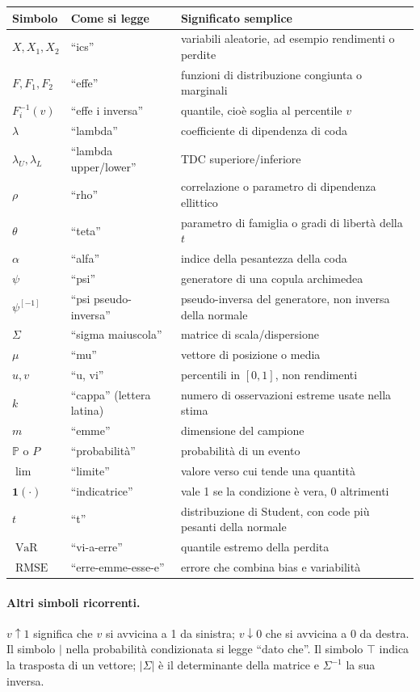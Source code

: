 \documentclass[11pt,a4paper]{article}
\newcommand{\Prob}{\mathbb{P}}
\newcommand{\ind}{\mathbf{1}}
\begin{document}
\begin{center}
\small
\begin{tabular}{p{}p{}p{}}
\toprule
Simbolo & Come si legge & Significato semplice\\
\midrule
$X,X_1,X_2$ & ``ics'' & variabili aleatorie, ad esempio rendimenti o perdite\\
$F,F_1,F_2$ & ``effe'' & funzioni di distribuzione congiunta o marginali\\
$F_i^{-1}(v)$ & ``effe i inversa'' & quantile, cioè soglia al percentile $v$\\
$\lambda$ & ``lambda'' & coefficiente di dipendenza di coda\\
$\lambda_U,\lambda_L$ & ``lambda upper/lower'' & TDC superiore/inferiore\\
$\rho$ & ``rho'' & correlazione o parametro di dipendenza ellittico\\
$\theta$ & ``teta'' & parametro di famiglia o gradi di libertà della $t$\\
$\alpha$ & ``alfa'' & indice della pesantezza della coda\\
$\psi$ & ``psi'' & generatore di una copula archimedea\\
$\psi^{[-1]}$ & ``psi pseudo-inversa'' & pseudo-inversa del generatore, non inversa della normale\\
$\Sigma$ & ``sigma maiuscola'' & matrice di scala/dispersione\\
$\mu$ & ``mu'' & vettore di posizione o media\\
$u,v$ & ``u, vi'' & percentili in $[0,1]$, non rendimenti\\
$k$ & ``cappa'' (lettera latina) & numero di osservazioni estreme usate nella stima\\
$m$ & ``emme'' & dimensione del campione\\
$\Prob$ o $P$ & ``probabilità'' & probabilità di un evento\\
$\lim$ & ``limite'' & valore verso cui tende una quantità\\
$\ind(\cdot)$ & ``indicatrice'' & vale 1 se la condizione è vera, 0 altrimenti\\
$t$ & ``t'' & distribuzione di Student, con code più pesanti della normale\\
$\operatorname{VaR}$ & ``vi-a-erre'' & quantile estremo della perdita\\
$\operatorname{RMSE}$ & ``erre-emme-esse-e'' & errore che combina bias e variabilità\\
\bottomrule
\end{tabular}
\end{center}

\paragraph{Altri simboli ricorrenti.}
$v\uparrow1$ significa che $v$ si avvicina a 1 da sinistra; $v\downarrow0$
che si avvicina a 0 da destra. Il simbolo $\mid$ nella probabilità
condizionata si legge ``dato che''. Il simbolo $\top$ indica la trasposta di
un vettore; $|\Sigma|$ è il determinante della matrice e $\Sigma^{-1}$ la sua
inversa.
\end{document}

